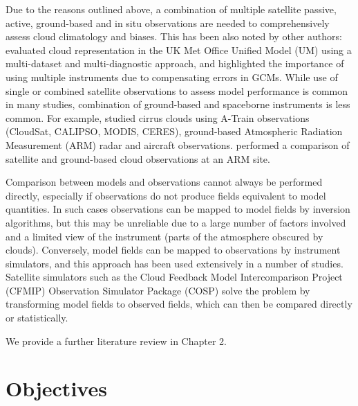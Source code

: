 Due to the reasons outlined above, a combination of multiple satellite passive, active,
ground-based and in situ observations are needed to comprehensively assess
cloud climatology and biases. This has been also noted by other authors:
\cite{williams2017} evaluated cloud representation in the UK Met Office
Unified Model (UM) using a multi-dataset and multi-diagnostic approach, and
highlighted the
importance of using multiple instruments due to compensating errors in GCMs.
While use of single or combined satellite observations to assess model
performance is common in many studies,
combination of ground-based and spaceborne instruments is less common.
For example, \cite{muhlbauer2015} studied cirrus clouds using A-Train
observations (CloudSat, CALIPSO, MODIS, CERES), ground-based
Atmospheric Radiation Measurement (ARM) radar and aircraft observations.
\cite{zhang2017} performed a comparison of satellite and ground-based cloud
observations at an ARM site.

Comparison between models and observations cannot always be performed directly,
especially if observations do not produce fields equivalent to model quantities.
In such cases observations can be mapped to model fields by inversion algorithms,
but this may be unreliable
due to a large number of factors involved and a limited view of the instrument
(parts of the atmosphere obscured by clouds).
Conversely, model fields can be mapped to observations by instrument simulators,
and this approach has been used extensively in a number of studies.
Satellite simulators such as the Cloud Feedback Model Intercomparison Project (CFMIP) Observation Simulator Package (COSP)
\citep{bodas-salcedo2011} solve the problem
by transforming model fields to observed fields, which can then
be compared directly or statistically.

We provide a further literature review in Chapter 2.

\section{Objectives}
\label{sec:1:objectives}

